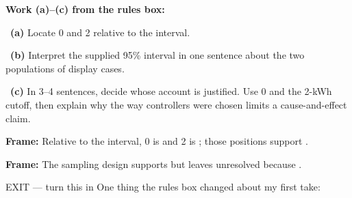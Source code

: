 \documentclass[11pt]{article}
\begin{document}
\newpage
\textbf{Work (a)--(c) from the rules box:}\par\smallskip

~\textbf{(a)} Locate 0 and 2 relative to the interval.\par
\workspace{0.7in}

~\textbf{(b)} Interpret the supplied 95\% interval in one sentence about the two populations of display cases.\par
\workspace{1.4in}

~\textbf{(c)} In 3--4 sentences, decide whose account is justified. Use 0 and the 2-kWh cutoff, then explain why the way controllers were chosen limits a cause-and-effect claim.\par
\workspace{2.0in}

\begin{sentenceframebox}\raggedright\textbf{Frame:} Relative to the interval, 0 is \blank[0.9in] and 2 is \blank[0.9in]; those positions support \blank[2.4in].\end{sentenceframebox}

\begin{sentenceframebox}\raggedright\textbf{Frame:} The sampling design supports \blank[2.0in] but leaves \blank[1.8in] unresolved because \blank[1.8in].\end{sentenceframebox}

\begin{summaryexitbox}{EXIT --- turn this in}
One thing the rules box changed about my first take: \hrulefill\par
\workspace{0.4in}
\end{summaryexitbox}
\end{document}
